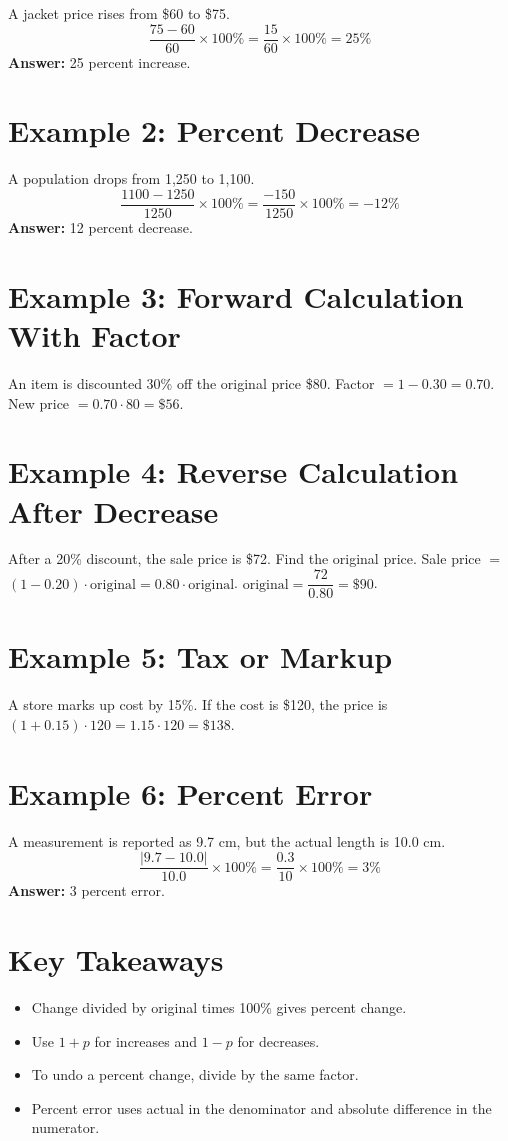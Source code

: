 \documentclass[14pt]{extarticle}
\begin{document}
A jacket price rises from \$60 to \$75.  
\[
\frac{75-60}{60}\times 100\%=\frac{15}{60}\times 100\%=25\%
\]
\textbf{Answer:} 25 percent increase.

\section*{Example 2: Percent Decrease}

A population drops from 1{,}250 to 1{,}100.  
\[
\frac{1100-1250}{1250}\times 100\%=\frac{-150}{1250}\times 100\%=-12\%
\]
\textbf{Answer:} 12 percent decrease.

\section*{Example 3: Forward Calculation With Factor}

An item is discounted 30\% off the original price \$80.  
Factor \(=1-0.30=0.70\). New price \(=0.70\cdot 80=\$56\).

\section*{Example 4: Reverse Calculation After Decrease}

After a 20\% discount, the sale price is \$72. Find the original price.  
Sale price \(=\) \((1-0.20)\cdot \text{original}=0.80\cdot \text{original}\).  
\(\text{original}=\dfrac{72}{0.80}=\$90\).

\section*{Example 5: Tax or Markup}

A store marks up cost by 15\%. If the cost is \$120, the price is  
\((1+0.15)\cdot 120=1.15\cdot 120=\$138\).

\section*{Example 6: Percent Error}

A measurement is reported as 9.7 cm, but the actual length is 10.0 cm.
\[
\frac{|9.7-10.0|}{10.0}\times 100\%=\frac{0.3}{10}\times 100\%=3\%
\]
\textbf{Answer:} 3 percent error.

\section*{Key Takeaways}
\begin{itemize}
  \item Change divided by original times 100\% gives percent change.
  \item Use \(1+p\) for increases and \(1-p\) for decreases.
  \item To undo a percent change, divide by the same factor.
  \item Percent error uses actual in the denominator and absolute difference in the numerator.
\end{itemize}
\end{document}
